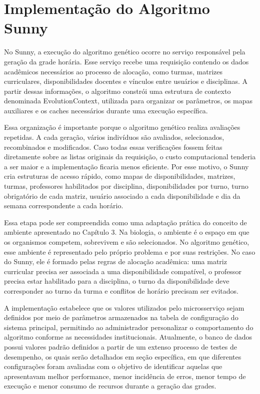 \section{Implementação do Algoritmo Sunny}
\label{sec:7.1}

No Sunny, a execução do algoritmo genético ocorre no serviço responsável pela geração da grade horária. Esse serviço recebe uma requisição contendo os dados acadêmicos necessários ao processo de alocação, como turmas, matrizes curriculares, disponibilidades docentes e vínculos entre usuários e disciplinas. A partir dessas informações, o algoritmo constrói uma estrutura de contexto denominada EvolutionContext, utilizada para organizar os parâmetros, os mapas auxiliares e os caches necessários durante uma execução específica.

Essa organização é importante porque o algoritmo genético realiza avaliações repetidas. A cada geração, vários indivíduos são avaliados, selecionados, recombinados e modificados. Caso todas essas verificações fossem feitas diretamente sobre as listas originais da requisição, o custo computacional tenderia a ser maior e a implementação ficaria menos eficiente. Por esse motivo, o Sunny cria estruturas de acesso rápido, como mapas de disponibilidades, matrizes, turmas, professores habilitados por disciplina, disponibilidades por turno, turno obrigatório de cada matriz, usuário associado a cada disponibilidade e dia da semana correspondente a cada horário.

Essa etapa pode ser compreendida como uma adaptação prática do conceito de ambiente apresentado no Capítulo 3. Na biologia, o ambiente é o espaço em que os organismos competem, sobrevivem e são selecionados. No algoritmo genético, esse ambiente é representado pelo próprio problema e por suas restrições. No caso do Sunny, ele é formado pelas regras de alocação acadêmica: uma matriz curricular precisa ser associada a uma disponibilidade compatível, o professor precisa estar habilitado para a disciplina, o turno da disponibilidade deve corresponder ao turno da turma e conflitos de horário precisam ser evitados.

A implementação estabelece que os valores utilizados pelo microsserviço sejam definidos por meio de parâmetros armazenados na tabela de configuração do sistema principal, permitindo ao administrador personalizar o comportamento do algoritmo conforme as necessidades institucionais. Atualmente, o banco de dados possui valores padrão definidos a partir de um extenso processo de testes de desempenho, os quais serão detalhados em seção específica, em que diferentes configurações foram avaliadas com o objetivo de identificar aquelas que apresentavam melhor performance, menor incidência de erros, menor tempo de execução e menor consumo de recursos durante a geração das grades.

